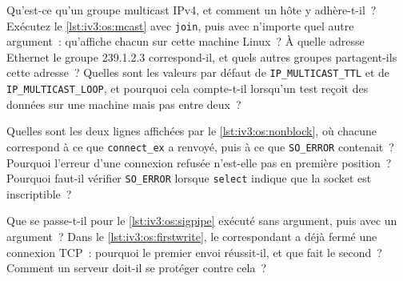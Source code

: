 \begin{question}\label{iq:iv3:operating-systems-concurrency-and-networks:26}
Qu'est-ce qu'un groupe multicast IPv4, et comment un hôte y adhère-t-il~? Exécutez le \cref{lst:iv3:os:mcast} avec \texttt{join}, puis avec n'importe quel autre argument~: qu'affiche chacun sur cette machine Linux~? À quelle adresse Ethernet le groupe 239.1.2.3 correspond-il, et quels autres groupes partagent-ils cette adresse~? Quelles sont les valeurs par défaut de \texttt{IP\_MULTICAST\_TTL} et de \texttt{IP\_MULTICAST\_LOOP}, et pourquoi cela compte-t-il lorsqu'un test reçoit des données sur une machine mais pas entre deux~?
\label{lst:iv3:os:mcast}
\end{question}

\begin{question}\label{iq:iv3:operating-systems-concurrency-and-networks:27}
Quelles sont les deux lignes affichées par le \cref{lst:iv3:os:nonblock}, où chacune correspond à ce que \texttt{connect\_ex} a renvoyé, puis à ce que \texttt{SO\_ERROR} contenait~? Pourquoi l'erreur d'une connexion refusée n'est-elle pas en première position~? Pourquoi faut-il vérifier \texttt{SO\_ERROR} lorsque \texttt{select} indique que la socket est inscriptible~?
\label{lst:iv3:os:nonblock}
\end{question}

\begin{question}\label{iq:iv3:operating-systems-concurrency-and-networks:28}
Que se passe-t-il pour le \cref{lst:iv3:os:sigpipe} exécuté sans argument, puis avec un argument~? Dans le \cref{lst:iv3:os:firstwrite}, le correspondant a déjà fermé une connexion TCP~: pourquoi le premier envoi réussit-il, et que fait le second~? Comment un serveur doit-il se protéger contre cela~?
\label{lst:iv3:os:sigpipe}
\label{lst:iv3:os:firstwrite}
\end{question}

